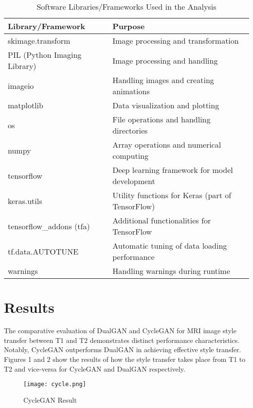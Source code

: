 \documentclass[conference]{IEEEtran}
\begin{document}
\begin{table}[htbp]
    \caption{Software Libraries/Frameworks Used in the Analysis}
    \begin{center}
        \begin{tabular}{|p{3cm}|p{5cm}|}
            \hline
            \textbf{Library/Framework} & \textbf{Purpose} \\
            \hline
            skimage.transform & Image processing and transformation \\
            PIL (Python Imaging Library) & Image processing and handling \\
            imageio & Handling images and creating animations \\
            matplotlib & Data visualization and plotting \\
            os & File operations and handling directories \\
            numpy & Array operations and numerical computing \\
            tensorflow & Deep learning framework for model development \\
            keras.utils & Utility functions for Keras (part of TensorFlow) \\
            tensorflow\_addons (tfa) & Additional functionalities for TensorFlow \\
            tf.data.AUTOTUNE & Automatic tuning of data loading performance \\
            warnings & Handling warnings during runtime \\
            \hline
        \end{tabular}
    \end{center}
\end{table}


\section{Results}
The comparative evaluation of DualGAN and CycleGAN for MRI image style transfer between T1 and T2 demonstrates distinct performance characteristics. Notably, CycleGAN outperforms DualGAN in achieving effective style transfer. Figures 1 and 2 show the results of how the style transfer takes place from T1 to T2 and vice-versa for CycleGAN and DualGAN respectively.

\begin{figure}[!ht]
  \centering
  \texttt{[image: cycle.png]}
  \captionsetup{justification=centering}
  \caption{CycleGAN Result}
  \label{fig:CycleGAN Result}
\end{figure}
\end{document}
